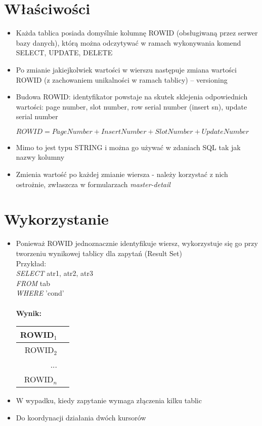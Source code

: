 \documentclass[a4paper,twoside]{article}
\begin{document}
  	\section*{Właściwości}
  	\begin{itemize}
  		\item Każda tablica posiada domyślnie kolumnę ROWID (obsługiwaną przez serwer bazy danych), którą można odczytywać w ramach wykonywania komend SELECT, UPDATE, DELETE
  		\item Po zmianie jakiejkolwiek wartości w wierszu następuje zmiana wartości ROWID (z zachowaniem unikalności w ramach tablicy) – versioning
  		\item Budowa ROWID: identyfikator powstaje na skutek sklejenia odpowiednich wartości: page number, slot number, row serial number (insert sn), update serial number
  		\begin{center}
  			\(ROWID = PageNumber  + InsertNumber + SlotNumber + UpdateNumber\)
  		\end{center}
  		\item Mimo to jest typu STRING i można go używać w zdaniach SQL tak jak nazwy kolumny
  		\item Zmienia wartość po każdej zmianie wiersza - należy korzystać z nich ostrożnie, zwłaszcza w formularzach \emph{master-detail}
  	\end{itemize}
  	\section*{Wykorzystanie}
  	\begin{itemize}
  		\item Ponieważ ROWID jednoznacznie identyfikuje wiersz, wykorzystuje się go przy tworzeniu wynikowej tablicy dla zapytań (Result Set)\\
  		Przykład:\\
  		\emph{SELECT} atr1, atr2, atr3\\
  		\emph{FROM} tab\\
  		\emph{WHERE} 'cond'\\\\
  		\textbf{Wynik:}\\
  		\begin{tabular}{|r|l|}
  			\hline 
  			ROWID${_1}$\\
  			\hline
  			ROWID${_2}$ \\
  			\hline
  			...\\
  			\hline
  			ROWID${_n}$\\
  			\hline
  			
  		\end{tabular}
  		\item W wypadku, kiedy zapytanie wymaga złączenia kilku tablic
  		\item Do koordynacji działania dwóch kursorów
  	\end{itemize}
  	
\end{document}
